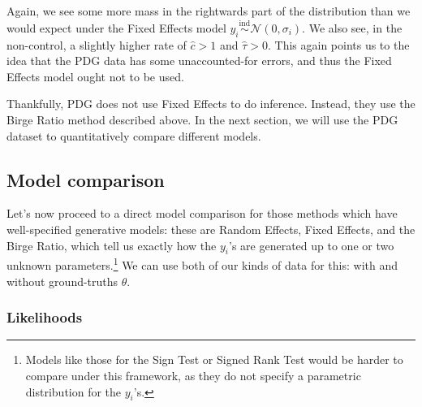\documentclass[letterpaper,12pt]{article}
\begin{document}
Again, we see some more mass in the rightwards part of the distribution than we would expect under the Fixed Effects model $y_i\overset{\mathrm{ind}}{\sim}\mathcal{N}(0, \sigma_i)$. We also see, in the non-control, a slightly higher rate of $\hat c >1$ and $\hat \tau > 0$. This again points us to the idea that the PDG data has some unaccounted-for errors, and thus the Fixed Effects model ought not to be used.

Thankfully, PDG does not use Fixed Effects to do inference. Instead, they use the Birge Ratio method described above. In the next section, we will use the PDG dataset to quantitatively compare different models.

\subsection{Model comparison}

Let's now proceed to a direct model comparison for those methods which have well-specified generative models: these are Random Effects, Fixed Effects, and the Birge Ratio, which tell us exactly how the $y_i$'s are generated up to one or two unknown parameters.\footnote{Models like those for the Sign Test or Signed Rank Test would be harder to compare under this framework, as they do not specify a parametric distribution for the $y_i$'s.} We can use both of our kinds of data for this: with and without ground-truths $\theta$. 

\subsubsection{Likelihoods}
\end{document}
